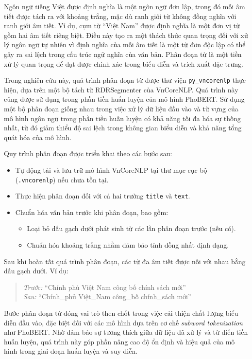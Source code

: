 \documentclass[12pt, a4paper]{report}
\begin{document}
Ngôn ngữ tiếng Việt được định nghĩa là một ngôn ngữ đơn lập, trong đó mỗi âm tiết được tách ra với khoảng trắng, mặc dù ranh giới từ không đồng nghĩa với ranh giới âm tiết. Ví dụ, cụm từ ``Việt Nam'' được định nghĩa là một đơn vị từ gồm hai âm tiết riêng biệt. Điều này tạo ra một thách thức quan trọng đối với xử lý ngôn ngữ tự nhiên vì định nghĩa của mỗi âm tiết là một từ đơn độc lập có thể gây ra sai lệch trong cấu trúc ngữ nghĩa của văn bản. Phân đoạn từ là một tiền xử lý quan trọng để đạt được chính xác trong biểu diễn và trích xuất đặc trưng.

Trong nghiên cứu này, quá trình phân đoạn từ được thư viện \texttt{py\_vncorenlp} thực hiện, dựa trên một bộ tách từ RDRSegmenter của VnCoreNLP. Quá trình này cũng được sử dụng trong phần tiền huấn luyện của mô hình PhoBERT. Sử dụng một bộ phân đoạn giống nhau trong việc xử lý dữ liệu đầu vào và từ vựng của mô hình ngôn ngữ trong phần tiền huấn luyện có khả năng tối đa hóa sự thống nhất, từ đó giảm thiểu độ sai lệch trong không gian biểu diễn và khả năng tổng quát hóa của mô hình.

Quy trình phân đoạn được triển khai theo các bước sau:

\begin{itemize}[leftmargin=2em]
  \item Tự động tải và lưu trữ mô hình VnCoreNLP tại thư mục cục bộ (\texttt{.vncorenlp}) nếu chưa tồn tại.
  \item Thực hiện phân đoạn đối với cả hai trường \texttt{title} và \texttt{text}.
  \item Chuẩn hóa văn bản trước khi phân đoạn, bao gồm:
  \begin{itemize}
    \item Loại bỏ dấu gạch dưới phát sinh từ các lần phân đoạn trước (nếu có).
    \item Chuẩn hóa khoảng trắng nhằm đảm bảo tính đồng nhất định dạng.
  \end{itemize}
\end{itemize}

Sau khi hoàn tất quá trình phân đoạn, các từ đa âm tiết được nối với nhau bằng dấu gạch dưới. Ví dụ:

\begin{quote}
\textit{Trước:} ``Chính phủ Việt Nam công bố chính sách mới'' \\
\textit{Sau:} ``Chính\_phủ Việt\_Nam công\_bố chính\_sách mới''
\end{quote}

Bước phân đoạn từ đóng vai trò then chốt trong việc cải thiện chất lượng biểu diễn đầu vào, đặc biệt đối với các mô hình dựa trên cơ chế \textit{subword tokenization} như PhoBERT. Nhờ đảm bảo sự tương thích giữa dữ liệu đã xử lý và từ điển tiền huấn luyện, quá trình này góp phần nâng cao độ ổn định và hiệu quả của mô hình trong giai đoạn huấn luyện và suy diễn.
\end{document}
